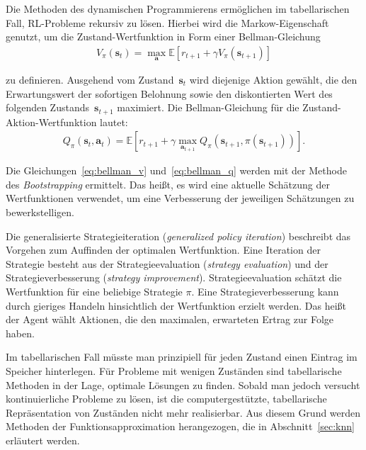 Die Methoden des dynamischen Programmierens ermöglichen im tabellarischen Fall, RL-Probleme rekursiv zu lösen. Hierbei wird die Markow-Eigenschaft genutzt, um die Zustand-Wertfunktion in Form einer Bellman-Gleichung
\begin{align}
V_\pi (\bm{s}_t) = \max\limits_{\bm{a}} \mathds{E}[r_{t+1} + \gamma V_\pi(\bm{s}_{t+1})]
\label{eq:bellman_v}
\end{align}

zu definieren. Ausgehend vom Zustand~$\bm{s}_t$ wird diejenige Aktion gewählt, die den Erwartungswert der sofortigen Belohnung sowie den diskontierten Wert des folgenden Zustands~$\bm{s}_{t+1}$ maximiert. Die Bellman-Gleichung für die Zustand-Aktion-Wertfunktion lautet:
\begin{align}
Q_\pi (\bm{s}_t, \bm{a}_t) = \mathds{E} \left[r_{t+1} + \gamma \max\limits_{\bm{a}_{t+1}} Q_\pi (\bm{s}_{t+1}, \pi(\bm{s}_{t+1})) \right].
\label{eq:bellman_q}
\end{align}

Die Gleichungen~\eqref{eq:bellman_v} und~\eqref{eq:bellman_q} werden mit der Methode des \textit{Bootstrapping} ermittelt. Das heißt, es wird eine aktuelle Schätzung der Wertfunktionen verwendet, um eine Verbesserung der jeweiligen Schätzungen zu bewerkstelligen. 

Die generalisierte Strategieiteration (\textit{generalized policy iteration}) beschreibt das Vorgehen zum Auffinden der optimalen Wertfunktion. Eine Iteration der Strategie besteht aus der Strategieevaluation (\textit{strategy evaluation}) und der Strategieverbesserung (\textit{strategy improvement}). Strategieevaluation schätzt die Wertfunktion für eine beliebige Strategie $\pi$. Eine Strategieverbesserung kann durch gieriges Handeln hinsichtlich der Wertfunktion erzielt werden. Das heißt der Agent wählt Aktionen, die den maximalen, erwarteten Ertrag zur Folge haben. 

Im tabellarischen Fall müsste man prinzipiell für jeden Zustand einen Eintrag im Speicher hinterlegen. Für Probleme mit wenigen Zuständen sind tabellarische Methoden in der Lage, optimale Lösungen zu finden. Sobald man jedoch versucht kontinuierliche Probleme zu lösen, ist die computergestützte, tabellarische Repräsentation von Zuständen nicht mehr realisierbar. 
Aus diesem Grund werden Methoden der Funktionsapproximation herangezogen, die in Abschnitt~\ref{sec:knn} erläutert werden.\newline

